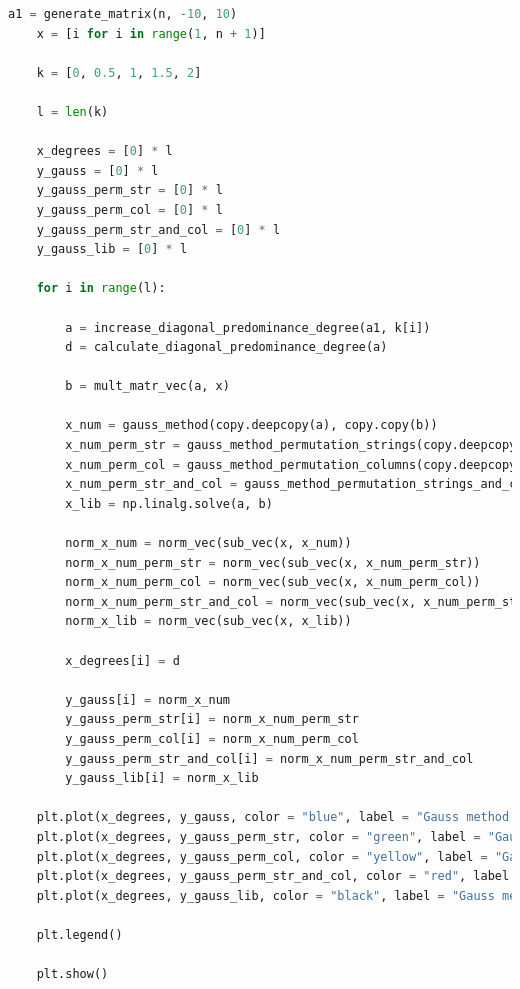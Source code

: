 \documentclass[a4paper, 14pt]{extarticle}
\begin{document}
\begin{lstlisting}[language={python},caption={Метод Гаусса},label={lst:code1}]
    a1 = generate_matrix(n, -10, 10)
    x = [i for i in range(1, n + 1)]

    k = [0, 0.5, 1, 1.5, 2]

    l = len(k)

    x_degrees = [0] * l
    y_gauss = [0] * l
    y_gauss_perm_str = [0] * l
    y_gauss_perm_col = [0] * l
    y_gauss_perm_str_and_col = [0] * l
    y_gauss_lib = [0] * l

    for i in range(l):

        a = increase_diagonal_predominance_degree(a1, k[i])
        d = calculate_diagonal_predominance_degree(a)

        b = mult_matr_vec(a, x)

        x_num = gauss_method(copy.deepcopy(a), copy.copy(b))
        x_num_perm_str = gauss_method_permutation_strings(copy.deepcopy(a), copy.copy(b))
        x_num_perm_col = gauss_method_permutation_columns(copy.deepcopy(a), copy.copy(b))
        x_num_perm_str_and_col = gauss_method_permutation_strings_and_columns(copy.deepcopy(a), copy.copy(b))
        x_lib = np.linalg.solve(a, b)

        norm_x_num = norm_vec(sub_vec(x, x_num))
        norm_x_num_perm_str = norm_vec(sub_vec(x, x_num_perm_str))
        norm_x_num_perm_col = norm_vec(sub_vec(x, x_num_perm_col))
        norm_x_num_perm_str_and_col = norm_vec(sub_vec(x, x_num_perm_str_and_col))
        norm_x_lib = norm_vec(sub_vec(x, x_lib))

        x_degrees[i] = d

        y_gauss[i] = norm_x_num
        y_gauss_perm_str[i] = norm_x_num_perm_str
        y_gauss_perm_col[i] = norm_x_num_perm_col
        y_gauss_perm_str_and_col[i] = norm_x_num_perm_str_and_col
        y_gauss_lib[i] = norm_x_lib

    plt.plot(x_degrees, y_gauss, color = "blue", label = "Gauss method classic")
    plt.plot(x_degrees, y_gauss_perm_str, color = "green", label = "Gauss method permutation strings")
    plt.plot(x_degrees, y_gauss_perm_col, color = "yellow", label = "Gauss method permutation columns")
    plt.plot(x_degrees, y_gauss_perm_str_and_col, color = "red", label = "Gauss method permutation strings and columns")
    plt.plot(x_degrees, y_gauss_lib, color = "black", label = "Gauss method library")

    plt.legend()

    plt.show()

\end{lstlisting}
\end{document}
